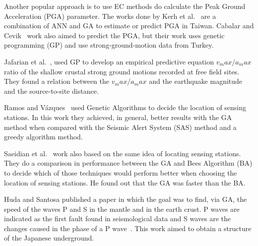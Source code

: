 Another popular approach is to use EC methods do calculate the Peak
Ground Acceleration (PGA) parameter. The works done by Kerh et
al.~\cite{Kerh2010, Kerh2015} are a combination of ANN and GA to
estimate or predict PGA in Taiwan. Cabalar and
Cevik~\cite{Cabalar2009} work also aimed to predict the PGA, but their
work uses genetic programming (GP) and use strong-ground-motion data
from Turkey.

Jafarian et al.~\cite{jafarian2010empirical}, used GP to develop an
empirical predictive equation $v_max/a_max$ ratio of the shallow
crustal strong ground motions recorded at free field sites. They found
a relation between the $v_max/a_max$ and the earthquake magnitude and
the source-to-site distance.
 
Ramos and Vázques~\cite{Ramos2011} used Genetic Algorithms to decide
the location of sensing stations. In this work they achieved, in
general, better results with the GA method when compared with the
Seismic Alert System (SAS) method and a greedy algorithm
method.

Saeidian et al.~\cite{saeidian2016evaluation} work also based
on the same idea of locating sensing stations. They do a comparison in
performance between the GA and Bees Algorithm (BA) to decide which of
those techniques would perform better when choosing the location of
sensing stations. He found out that the GA was faster than the BA.

Huda and Santosa \cite{ijse5762} published a paper in which the goal
was to find, via GA, the speed of the waves P and S in the mantle and
in the earth crust. P waves are indicated as the first fault found in
seismological data and S waves are the changes caused in the phase of
a P wave~\cite{ijse5762}. This work aimed to obtain a structure of the
Japanese underground.

